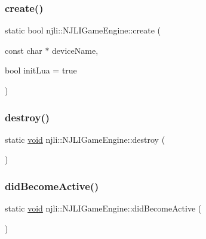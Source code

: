 \subsubsection{\texorpdfstring{create()}{create()}}
{\footnotesize\ttfamily static bool njli\+::\+N\+J\+L\+I\+Game\+Engine\+::create (\begin{DoxyParamCaption}\item[{const char $\ast$}]{device\+Name,  }\item[{bool}]{init\+Lua = {\ttfamily true} }\end{DoxyParamCaption})\hspace{0.3cm}{\ttfamily [static]}}

\mbox{\label{classnjli_1_1_n_j_l_i_game_engine_ac672aa4d352a38dee9a98e64609509db}} 
\subsubsection{\texorpdfstring{destroy()}{destroy()}}
{\footnotesize\ttfamily static \mbox{\hyperlink{_thread_8h_af1e856da2e658414cb2456cb6f7ebc66}{void}} njli\+::\+N\+J\+L\+I\+Game\+Engine\+::destroy (\begin{DoxyParamCaption}{ }\end{DoxyParamCaption})\hspace{0.3cm}{\ttfamily [static]}}

\mbox{\label{classnjli_1_1_n_j_l_i_game_engine_a98c166ee40919fbf616f358a8bcb9bdc}} 
\subsubsection{\texorpdfstring{did\+Become\+Active()}{didBecomeActive()}}
{\footnotesize\ttfamily static \mbox{\hyperlink{_thread_8h_af1e856da2e658414cb2456cb6f7ebc66}{void}} njli\+::\+N\+J\+L\+I\+Game\+Engine\+::did\+Become\+Active (\begin{DoxyParamCaption}{ }\end{DoxyParamCaption})\hspace{0.3cm}{\ttfamily [static]}}

